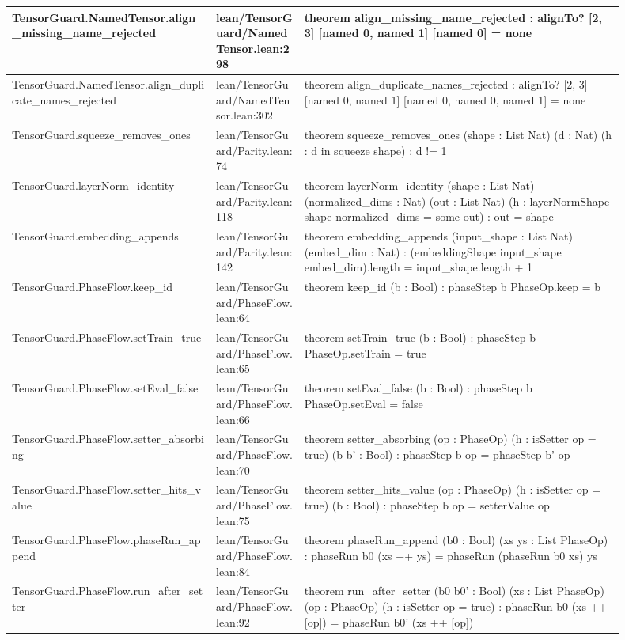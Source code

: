 \documentclass[10pt]{article}
\begin{document}
\begin{longtable}{|p{0.30\linewidth}|p{0.13\linewidth}|p{0.47\linewidth}|}
\hline
TensorGuard.NamedTensor.align\_missing\_name\_rejected & lean/TensorGuard/NamedTensor.lean:298 & theorem align\_missing\_name\_rejected : alignTo? [2, 3] [named 0, named 1] [named 0] = none \\
\hline
TensorGuard.NamedTensor.align\_duplicate\_names\_rejected & lean/TensorGuard/NamedTensor.lean:302 & theorem align\_duplicate\_names\_rejected : alignTo? [2, 3] [named 0, named 1] [named 0, named 0, named 1] = none \\
\hline
TensorGuard.squeeze\_removes\_ones & lean/TensorGuard/Parity.lean:74 & theorem squeeze\_removes\_ones (shape : List Nat) (d : Nat) (h : d in squeeze shape) : d != 1 \\
\hline
TensorGuard.layerNorm\_identity & lean/TensorGuard/Parity.lean:118 & theorem layerNorm\_identity (shape : List Nat) (normalized\_dims : Nat) (out : List Nat) (h : layerNormShape shape normalized\_dims = some out) : out = shape \\
\hline
TensorGuard.embedding\_appends & lean/TensorGuard/Parity.lean:142 & theorem embedding\_appends (input\_shape : List Nat) (embed\_dim : Nat) : (embeddingShape input\_shape embed\_dim).length = input\_shape.length + 1 \\
\hline
TensorGuard.PhaseFlow.keep\_id & lean/TensorGuard/PhaseFlow.lean:64 & theorem keep\_id (b : Bool) : phaseStep b PhaseOp.keep = b \\
\hline
TensorGuard.PhaseFlow.setTrain\_true & lean/TensorGuard/PhaseFlow.lean:65 & theorem setTrain\_true (b : Bool) : phaseStep b PhaseOp.setTrain = true \\
\hline
TensorGuard.PhaseFlow.setEval\_false & lean/TensorGuard/PhaseFlow.lean:66 & theorem setEval\_false (b : Bool) : phaseStep b PhaseOp.setEval = false \\
\hline
TensorGuard.PhaseFlow.setter\_absorbing & lean/TensorGuard/PhaseFlow.lean:70 & theorem setter\_absorbing (op : PhaseOp) (h : isSetter op = true) (b b' : Bool) : phaseStep b op = phaseStep b' op \\
\hline
TensorGuard.PhaseFlow.setter\_hits\_value & lean/TensorGuard/PhaseFlow.lean:75 & theorem setter\_hits\_value (op : PhaseOp) (h : isSetter op = true) (b : Bool) : phaseStep b op = setterValue op \\
\hline
TensorGuard.PhaseFlow.phaseRun\_append & lean/TensorGuard/PhaseFlow.lean:84 & theorem phaseRun\_append (b0 : Bool) (xs ys : List PhaseOp) : phaseRun b0 (xs ++ ys) = phaseRun (phaseRun b0 xs) ys \\
\hline
TensorGuard.PhaseFlow.run\_after\_setter & lean/TensorGuard/PhaseFlow.lean:92 & theorem run\_after\_setter (b0 b0' : Bool) (xs : List PhaseOp) (op : PhaseOp) (h : isSetter op = true) : phaseRun b0 (xs ++ [op]) = phaseRun b0' (xs ++ [op]) \\

\end{longtable}
\end{document}
